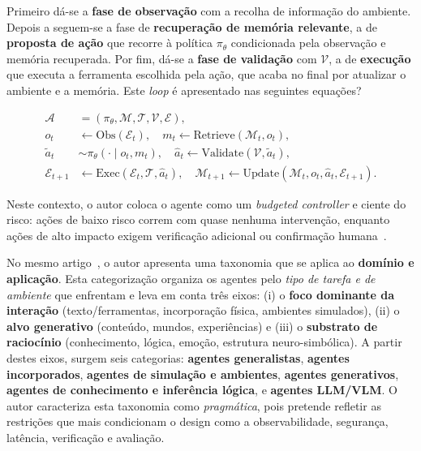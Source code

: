 Primeiro dá-se a \textbf{fase de observação} com a recolha de informação do ambiente. Depois a seguem-se a fase de \textbf{recuperação de memória relevante}, a de \textbf{proposta de ação} que recorre à política \(\pi_{\theta}\) condicionada pela observação e memória recuperada. Por fim, dá-se a \textbf{fase de validação} com \(\mathcal{V}\), a de \textbf{execução} que executa a ferramenta escolhida pela ação, que acaba no final por atualizar o ambiente e a memória. Este \textit{loop} é apresentado nas seguintes equações?

\begin{align}
	\mathcal{A} &= (\pi_{\theta}, \mathcal{M}, \mathcal{T}, \mathcal{V}, \mathcal{E}), \tag{1} \\[4pt]
	o_t &\leftarrow \mathrm{Obs}(\mathcal{E}_t), \quad m_t \leftarrow \mathrm{Retrieve}(\mathcal{M}_t, o_t), \tag{2} \\[4pt]
	\tilde{a}_t &\sim \pi_{\theta}(\cdot \mid o_t, m_t), \quad \hat{a}_t \leftarrow \mathrm{Validate}(\mathcal{V}, \tilde{a}_t), \tag{3} \\[4pt]
	\mathcal{E}_{t+1} &\leftarrow \mathrm{Exec}(\mathcal{E}_t, \mathcal{T}, \hat{a}_t), \quad \mathcal{M}_{t+1} \leftarrow \mathrm{Update}(\mathcal{M}_t, o_t, \hat{a}_t, \mathcal{E}_{t+1}). \tag{4}
\end{align}

Neste contexto, o autor coloca o agente como um \textit{budgeted controller} e ciente do risco: ações de baixo risco correm com quase nenhuma intervenção, enquanto ações de alto impacto exigem verificação adicional ou confirmação humana~\cite{xu2026ai}.


No mesmo artigo~\cite{xu2026ai}, o autor apresenta uma taxonomia que se aplica ao \textbf{domínio e aplicação}. Esta categorização organiza os agentes pelo \emph{tipo de tarefa e de ambiente} que enfrentam e leva em conta três eixos: (i) o \textbf{foco dominante da interação} (texto/ferramentas, incorporação física, ambientes simulados), (ii) o \textbf{alvo generativo} (conteúdo, mundos, experiências) e (iii) o \textbf{substrato de raciocínio} (conhecimento, lógica, emoção, estrutura neuro-simbólica). A partir destes eixos, surgem seis categorias: \textbf{agentes generalistas}, \textbf{agentes incorporados}, \textbf{agentes de simulação e ambientes}, \textbf{agentes generativos}, \textbf{agentes de conhecimento e inferência lógica}, e \textbf{agentes LLM/VLM}. O autor caracteriza esta taxonomia como \textit{pragmática}, pois pretende refletir as restrições que mais condicionam o design como a observabilidade, segurança, latência, verificação e avaliação.~\cite{xu2026ai}

